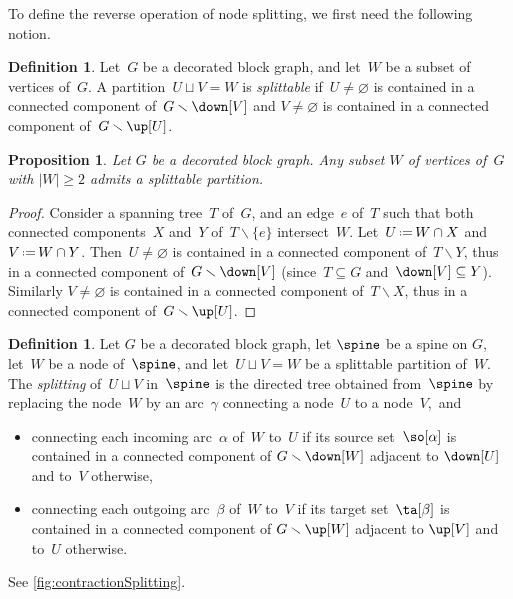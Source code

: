 \documentclass{amsart}
\newtheorem{proposition}[theorem]{Proposition}
\theoremstyle{definition}
\newtheorem{definition}[theorem]{Definition}
\newcommand{\ssm}{\smallsetminus} %
\newcommand{\eqdef}{\mbox{\,\raisebox{0.2ex}{\scriptsize\ensuremath{\mathrm:}}\ensuremath{=}\,}} %
\newcommand{\darkblue}{\color{darkblue}} %
\newcommand{\defn}[1]{\textsl{\darkblue #1}} %
\begin{document}
To define the reverse operation of node splitting, we first need the following notion.

\begin{definition}
  \label{def:splittable}
  Let~$G$ be a decorated block graph, and let~$W$ be a subset of vertices of~$G$.
  A partition~$U \sqcup V = W$ is \defn{splittable} if~$U \ne \varnothing$ is contained in a connected component of~$G \ssm \down[V]$ and $V \ne \varnothing$ is contained in a connected component of~$G \ssm \up[U]$.
\end{definition}

\begin{proposition}
  \label{prop:splittablePartitions}
  Let $G$ be a decorated block graph. Any subset $W$ of vertices of~$G$ with $|W| \ge 2$ admits a splittable partition.
\end{proposition}

\begin{proof} 
  Consider a spanning tree~$T$ of~$G$, and an edge~$e$ of~$T$ such that both connected components~$X$ and~$Y$ of~$T \ssm \{e\}$ intersect~$W$.
  Let~$U \eqdef W \cap X$ and~$V \eqdef W \cap Y$.
  Then~$U \ne \varnothing$ is contained in a connected component of~$T \ssm Y$, thus in a connected component of~$G \ssm \down[V]$ (since~$T \subseteq G$ and~$\down[V] \subseteq Y$).
  Similarly $V \ne \varnothing$ is contained in a connected component of~$T \ssm X$, thus in a connected component of~$G \ssm \up[U]$.
\end{proof}

\begin{definition}
  \label{def:vertexsplitting} 
  Let $G$ be a decorated block graph, let $\spine$ be a spine on $G$, let~$W$ be a node of~$\spine$, and let~$U \sqcup V = W$ be a splittable partition of~$W$.
  The \defn{splitting} of~$U \sqcup V$ in~$\spine$ is the directed tree obtained from~$\spine$ by replacing the node~$W$ by an arc~$\gamma$ connecting a node~$U$ to a node~$V$,~and
  \begin{itemize}
    \item connecting each incoming arc~$\alpha$ of~$W$ to~$U$ if its source set~$\so[\alpha]$ is contained in a connected component of $G \ssm \down[W]$ adjacent to $\down[U]$ and to~$V$ otherwise, 
    \item connecting each outgoing arc~$\beta$ of~$W$ to~$V$ if its target set~$\ta[\beta]$ is contained in a connected component of $G \ssm \up[W]$ adjacent to $\up[V]$ and to~$U$ otherwise.
  \end{itemize}
  See \cref{fig:contractionSplitting}.
\end{definition}
\end{document}
